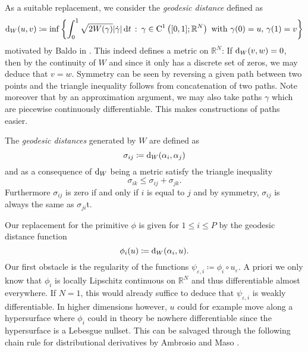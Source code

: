 As a suitable replacement, we consider the \emph{geodesic distance} defined as 
\begin{equation*}
		\geodesic_distance ( u, v )
		\coloneqq
		\inf
		\left\{
		\int_{ 0 }^{ 1 }
		\sqrt{ 2 W ( \gamma ) }
		\abs{ \dot{ \gamma }  }
		\dd{t}
		\,
		\colon
		\, \gamma \in \mathrm{ C }^{ 1 } \left( [0, 1 ] ; \mathbb{ R }^{ N } \right) \text{ with } \gamma( 0 ) = u,\, \gamma( 1 )= v 
		\right\}
\end{equation*}
motivated by Baldo in \cite{baldo_minimal_interface_criterion}.
This indeed defines a metric on $ \mathbb{ R }^{ N } $: If $ \geodesic_distance 
( v, w ) = 0 $, then by the continuity of $ W $ and since it only has a 
discrete set of zeros, we may deduce that $ v = w $. Symmetry can be seen by 
reversing a given path between two points and the triangle inequality follows 
from concatenation of two paths.
Note moreover that by an approximation argument, we may also take paths $ 
\gamma $ which are piecewise continuously differentiable. This makes 
constructions of paths easier.

The \emph{geodesic distances} generated by $ W $  are defined as
\begin{equation*}
	\sigma_{ i j } 
	\coloneqq
	\geodesic_distance ( \alpha_{ i } , \alpha_{ j } )
\end{equation*}
and as a consequence of $ \geodesic_distance $ being a metric satisfy the 
triangle inequality
\begin{equation*}
	\sigma_{ i k } \leq \sigma_{ i j } + \sigma_{ j k }.
\end{equation*}
Furthermore $ \sigma_{ i j } $ is zero if and only if $ i $ is equal to $ j $ 
and by symmetry, $ \sigma_{ i 
j } $ is always the same as $ \sigma_{ j i } $t.

Our replacement for the primitive $ \phi $ is given for $ 1 \leq i \leq P $ 
by the geodesic distance function
\begin{equation*}
	\phi_{ i } ( u ) 
	\coloneqq
	\geodesic_distance ( \alpha_{ i } , u ).
\end{equation*}
Our first obstacle is the regularity of the functions $ \psi_{ \varepsilon, i } 
\coloneqq \phi_{ i } \circ u_{ \varepsilon } $. A priori we only know that $ 
\phi_{ i } $ is locally Lipschitz continuous on $ \mathbb{ R }^{ N } $ and thus 
differentiable almost everywhere. If $ N = 1 $, this would already suffice 
to deduce that $ \psi_{ \varepsilon, i  }$ is weakly differentiable.
In higher dimensions however, $ u $ could for example move along a hypersurface 
where $ 
\phi_{ i } $ could in theory be nowhere differentiable since the hypersurface  
is a Lebesgue 
nullset. 
This can be salvaged through the following chain rule for 
distributional derivatives by Ambrosio and Maso 
\cite[Cor.~3.2]{ambrosio_maso_chain_rule}.

